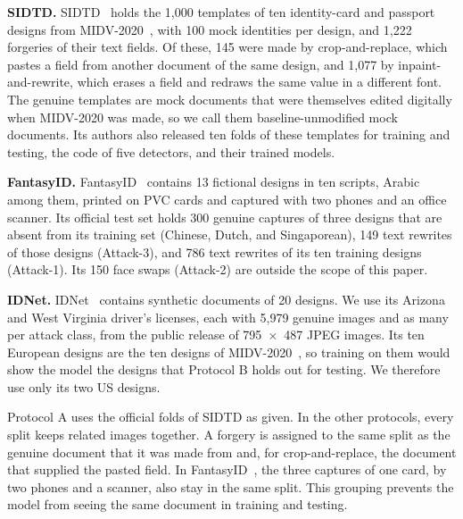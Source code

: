 \documentclass[12pt,a4paper]{article}
\newif\ifshowguidance
\newcommand{\todo}[1]{\ifshowguidance\leavevmode{\color{gray}\itshape [#1]}\fi}
\begin{document}
\textbf{SIDTD.} SIDTD~\cite{boned2024sidtd} holds the 1,000 templates of ten identity-card and passport designs from MIDV-2020~\cite{bulatov2022midv2020}, with 100 mock identities per design, and 1,222 forgeries of their text fields. Of these, 145 were made by crop-and-replace, which pastes a field from another document of the same design, and 1,077 by inpaint-and-rewrite, which erases a field and redraws the same value in a different font. The genuine templates are mock documents that were themselves edited digitally when MIDV-2020 was made, so we call them baseline-unmodified mock documents. Its authors also released ten folds of these templates for training and testing, the code of five detectors, and their trained models.

\textbf{FantasyID.} FantasyID~\cite{korshunov2025fantasyid} contains 13 fictional designs in ten scripts, Arabic among them, printed on PVC cards and captured with two phones and an office scanner. Its official test set holds 300 genuine captures of three designs that are absent from its training set (Chinese, Dutch, and Singaporean), 149 text rewrites of those designs (Attack-3), and 786 text rewrites of its ten training designs (Attack-1). Its 150 face swaps (Attack-2) are outside the scope of this paper.

\textbf{IDNet.} IDNet~\cite{guan2024idnet,guan2024idnetarxiv} contains synthetic documents of 20 designs. We use its Arizona and West Virginia driver's licenses, each with 5,979 genuine images and as many per attack class, from the public release of 795~$\times$~487 JPEG images. Its ten European designs are the ten designs of MIDV-2020~\cite{bulatov2022midv2020}, so training on them would show the model the designs that Protocol B holds out for testing. We therefore use only its two US designs.

Protocol A uses the official folds of SIDTD as given. In the other protocols, every split keeps related images together. A forgery is assigned to the same split as the genuine document that it was made from and, for crop-and-replace, the document that supplied the pasted field. In FantasyID~\cite{korshunov2025fantasyid}, the three captures of one card, by two phones and a scanner, also stay in the same split. This grouping prevents the model from seeing the same document in training and testing. \todo{Check whether SIDTD's official folds keep a forgery in the same split as its source document.}
\end{document}
